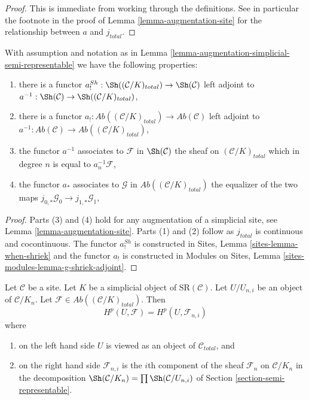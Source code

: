\begin{proof}
This is immediate from working through the definitions.
See in particular the footnote in the proof of
Lemma \ref{lemma-augmentation-site}
for the relationship between $a$ and $j_{total}$.
\end{proof}

\begin{lemma}
\label{lemma-comparison}
With assumption and notation as in
Lemma \ref{lemma-augmentation-simplicial-semi-representable}
we have the following properties:
\begin{enumerate}
\item there is a functor
$a^{Sh}_! : \Sh((\mathcal{C}/K)_{total}) \to \Sh(\mathcal{C})$
left adjoint to $a^{-1} : \Sh(\mathcal{C}) \to \Sh((\mathcal{C}/K)_{total})$,
\item there is a functor
$a_! : \textit{Ab}((\mathcal{C}/K)_{total}) \to \textit{Ab}(\mathcal{C})$
left adjoint to
$a^{-1} : \textit{Ab}(\mathcal{C}) \to \textit{Ab}((\mathcal{C}/K)_{total})$,
\item the functor $a^{-1}$ associates to
$\mathcal{F}$ in $\Sh(\mathcal{C})$ the sheaf on $(\mathcal{C}/K)_{total}$
which in degree $n$ is equal to $a_n^{-1}\mathcal{F}$,
\item the functor $a_*$ associates to $\mathcal{G}$ in
$\textit{Ab}((\mathcal{C}/K)_{total})$ the equalizer of the two maps
$j_{0, *}\mathcal{G}_0 \to j_{1, *}\mathcal{G}_1$,
\end{enumerate}
\end{lemma}

\begin{proof}
Parts (3) and (4) hold for any augmentation of a
simplicial site, see Lemma \ref{lemma-augmentation-site}.
Parts (1) and (2) follow as $j_{total}$ is continuous and cocontinuous.
The functor $a^{Sh}_!$ is constructed in
Sites, Lemma \ref{sites-lemma-when-shriek}
and the functor $a_!$ is constructed in
Modules on Sites, Lemma
\ref{sites-modules-lemma-g-shriek-adjoint}.
\end{proof}

\begin{lemma}
\label{lemma-sanity-check-simplicial-semi-representable}
Let $\mathcal{C}$ be a site. Let $K$ be a simplicial object of
$\text{SR}(\mathcal{C})$. Let $U/U_{n, i}$ be an object of
$\mathcal{C}/K_n$. Let
$\mathcal{F} \in \textit{Ab}((\mathcal{C}/K)_{total})$.
Then
$$
H^p(U, \mathcal{F}) = H^p(U, \mathcal{F}_{n, i})
$$
where
\begin{enumerate}
\item on the left hand side $U$ is viewed as an object of
$\mathcal{C}_{total}$, and
\item on the right hand side $\mathcal{F}_{n, i}$ is the $i$th
component of the sheaf $\mathcal{F}_n$ on $\mathcal{C}/K_n$
in the decomposition $\Sh(\mathcal{C}/K_n) = \prod \Sh(\mathcal{C}/U_{n, i})$
of Section \ref{section-semi-representable}.
\end{enumerate}
\end{lemma}

